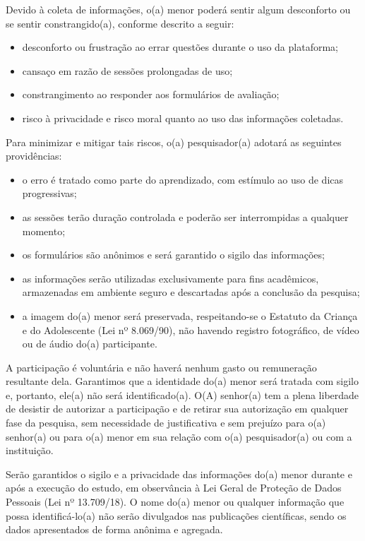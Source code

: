 Devido à coleta de informações, o(a) menor poderá sentir algum desconforto ou se sentir constrangido(a), conforme descrito a seguir:

\begin{itemize}
    \item desconforto ou frustração ao errar questões durante o uso da plataforma;
    \item cansaço em razão de sessões prolongadas de uso;
    \item constrangimento ao responder aos formulários de avaliação;
    \item risco à privacidade e risco moral quanto ao uso das informações coletadas.
\end{itemize}

Para minimizar e mitigar tais riscos, o(a) pesquisador(a) adotará as seguintes providências:

\begin{itemize}
    \item o erro é tratado como parte do aprendizado, com estímulo ao uso de dicas progressivas;
    \item as sessões terão duração controlada e poderão ser interrompidas a qualquer momento;
    \item os formulários são anônimos e será garantido o sigilo das informações;
    \item as informações serão utilizadas exclusivamente para fins acadêmicos, armazenadas em ambiente seguro e descartadas após a conclusão da pesquisa;
    \item a imagem do(a) menor será preservada, respeitando-se o Estatuto da Criança e do Adolescente (Lei nº 8.069/90), não havendo registro fotográfico, de vídeo ou de áudio do(a) participante.
\end{itemize}

A participação é voluntária e não haverá nenhum gasto ou remuneração resultante dela. Garantimos que a identidade do(a) menor será tratada com sigilo e, portanto, ele(a) não será identificado(a). O(A) senhor(a) tem a plena liberdade de desistir de autorizar a participação e de retirar sua autorização em qualquer fase da pesquisa, sem necessidade de justificativa e sem prejuízo para o(a) senhor(a) ou para o(a) menor em sua relação com o(a) pesquisador(a) ou com a instituição.

Serão garantidos o sigilo e a privacidade das informações do(a) menor durante e após a execução do estudo, em observância à Lei Geral de Proteção de Dados Pessoais (Lei nº 13.709/18). O nome do(a) menor ou qualquer informação que possa identificá-lo(a) não serão divulgados nas publicações científicas, sendo os dados apresentados de forma anônima e agregada.

